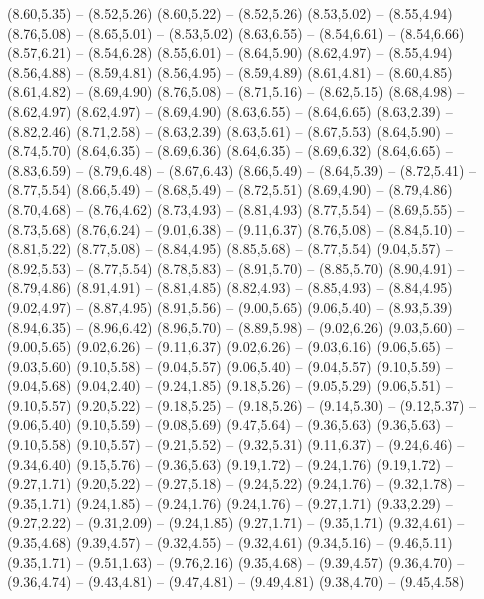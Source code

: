 {  (8.60,5.35) -- (8.52,5.26)
  (8.60,5.22) -- (8.52,5.26)
  (8.53,5.02) -- (8.55,4.94)
  (8.76,5.08) -- (8.65,5.01) -- (8.53,5.02)
  (8.63,6.55) -- (8.54,6.61) -- (8.54,6.66)
  (8.57,6.21) -- (8.54,6.28)
  (8.55,6.01) -- (8.64,5.90)
  (8.62,4.97) -- (8.55,4.94)
  (8.56,4.88) -- (8.59,4.81)
  (8.56,4.95) -- (8.59,4.89)
  (8.61,4.81) -- (8.60,4.85)
  (8.61,4.82) -- (8.69,4.90)
  (8.76,5.08) -- (8.71,5.16) -- (8.62,5.15)
  (8.68,4.98) -- (8.62,4.97)
  (8.62,4.97) -- (8.69,4.90)
  (8.63,6.55) -- (8.64,6.65)
  (8.63,2.39) -- (8.82,2.46)
  (8.71,2.58) -- (8.63,2.39)
  (8.63,5.61) -- (8.67,5.53)
  (8.64,5.90) -- (8.74,5.70)
  (8.64,6.35) -- (8.69,6.36)
  (8.64,6.35) -- (8.69,6.32)
  (8.64,6.65) -- (8.83,6.59) -- (8.79,6.48) -- (8.67,6.43)
  (8.66,5.49) -- (8.64,5.39) -- (8.72,5.41) -- (8.77,5.54)
  (8.66,5.49) -- (8.68,5.49) -- (8.72,5.51)
  (8.69,4.90) -- (8.79,4.86)
  (8.70,4.68) -- (8.76,4.62)
  (8.73,4.93) -- (8.81,4.93)
  (8.77,5.54) -- (8.69,5.55) -- (8.73,5.68)
  (8.76,6.24) -- (9.01,6.38) -- (9.11,6.37)
  (8.76,5.08) -- (8.84,5.10) -- (8.81,5.22)
  (8.77,5.08) -- (8.84,4.95)
  (8.85,5.68) -- (8.77,5.54)
  (9.04,5.57) -- (8.92,5.53) -- (8.77,5.54)
  (8.78,5.83) -- (8.91,5.70) -- (8.85,5.70)
  (8.90,4.91) -- (8.79,4.86)
  (8.91,4.91) -- (8.81,4.85)
  (8.82,4.93) -- (8.85,4.93) -- (8.84,4.95)
  (9.02,4.97) -- (8.87,4.95)
  (8.91,5.56) -- (9.00,5.65)
  (9.06,5.40) -- (8.93,5.39)
  (8.94,6.35) -- (8.96,6.42)
  (8.96,5.70) -- (8.89,5.98) -- (9.02,6.26)
  (9.03,5.60) -- (9.00,5.65)
  (9.02,6.26) -- (9.11,6.37)
  (9.02,6.26) -- (9.03,6.16)
  (9.06,5.65) -- (9.03,5.60)
  (9.10,5.58) -- (9.04,5.57)
  (9.06,5.40) -- (9.04,5.57)
  (9.10,5.59) -- (9.04,5.68)
  (9.04,2.40) -- (9.24,1.85)
  (9.18,5.26) -- (9.05,5.29)
  (9.06,5.51) -- (9.10,5.57)
  (9.20,5.22) -- (9.18,5.25) -- (9.18,5.26) -- (9.14,5.30) -- (9.12,5.37) -- (9.06,5.40)
  (9.10,5.59) -- (9.08,5.69)
  (9.47,5.64) -- (9.36,5.63)
  (9.36,5.63) -- (9.10,5.58)
  (9.10,5.57) -- (9.21,5.52) -- (9.32,5.31)
  (9.11,6.37) -- (9.24,6.46) -- (9.34,6.40)
  (9.15,5.76) -- (9.36,5.63)
  (9.19,1.72) -- (9.24,1.76)
  (9.19,1.72) -- (9.27,1.71)
  (9.20,5.22) -- (9.27,5.18) -- (9.24,5.22)
  (9.24,1.76) -- (9.32,1.78) -- (9.35,1.71)
  (9.24,1.85) -- (9.24,1.76)
  (9.24,1.76) -- (9.27,1.71)
  (9.33,2.29) -- (9.27,2.22) -- (9.31,2.09) -- (9.24,1.85)
  (9.27,1.71) -- (9.35,1.71)
  (9.32,4.61) -- (9.35,4.68)
  (9.39,4.57) -- (9.32,4.55) -- (9.32,4.61)
  (9.34,5.16) -- (9.46,5.11)
  (9.35,1.71) -- (9.51,1.63) -- (9.76,2.16)
  (9.35,4.68) -- (9.39,4.57)
  (9.36,4.70) -- (9.36,4.74) -- (9.43,4.81) -- (9.47,4.81) -- (9.49,4.81)
  (9.38,4.70) -- (9.45,4.58)
}
